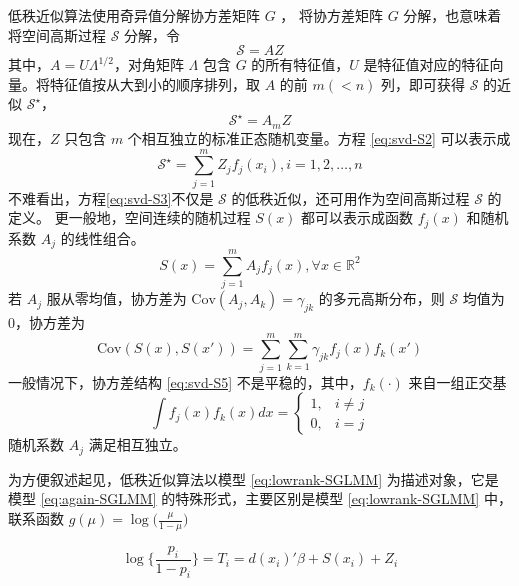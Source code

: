 \documentclass[12pt,a4paper,UTF8,twoside]{book}
\theoremstyle{definition}
\theoremstyle{definition}
\theoremstyle{definition}
\theoremstyle{remark}
\begin{document}
低秩近似算法使用奇异值分解协方差矩阵 \(G\) \citep{Diggle2007}，
将协方差矩阵 \(G\) 分解，也意味着将空间高斯过程 \(\mathcal{S}\) 分解，令
\[\mathcal{S} = AZ\] \noindent 其中，\(A = U\Lambda^{1/2}\)，对角矩阵
\(\Lambda\) 包含 \(G\) 的所有特征值，\(U\)
是特征值对应的特征向量。将特征值按从大到小的顺序排列，取 \(A\) 的前
\(m(<n)\) 列，即可获得 \(\mathcal{S}\) 的近似 \(\mathcal{S}^{\star}\)，
\begin{equation}
\mathcal{S}^{\star} = A_{m}Z \label{eq:svd-S2}
\end{equation} \noindent 现在，\(Z\) 只包含 \(m\)
个相互独立的标准正态随机变量。方程 \eqref{eq:svd-S2} 可以表示成
\begin{equation}
\mathcal{S}^{\star} = \sum_{j=1}^{m}Z_{j}f_{j}(x_{i}), i = 1,2,\ldots,n \label{eq:svd-S3}
\end{equation} \noindent 不难看出，方程\eqref{eq:svd-S3}不仅是
\(\mathcal{S}\) 的低秩近似，还可用作为空间高斯过程 \(\mathcal{S}\)
的定义。 更一般地，空间连续的随机过程 \(S(x)\) 都可以表示成函数
\(f_{j}(x)\) 和随机系数 \(A_{j}\) 的线性组合。 \begin{equation}
S(x) = \sum_{j=1}^{m}A_{j}f_{j}(x), \forall x \in \mathbb{R}^2 \label{eq:svd-S4}
\end{equation} \noindent 若 \(A_j\) 服从零均值，协方差为
\(\mathrm{Cov}(A_{j},A_{k})=\gamma_{jk}\) 的多元高斯分布，则
\(\mathcal{S}\) 均值为0，协方差为 \begin{equation}
\mathrm{Cov}(S(x),S(x')) =  \sum_{j=1}^{m}\sum_{k=1}^{m}\gamma_{jk}f_{j}(x)f_{k}(x') \label{eq:svd-S5}
\end{equation} \noindent 一般情况下，协方差结构 \eqref{eq:svd-S5}
不是平稳的，其中，\(f_{k}(\cdot)\) 来自一组正交基 \begin{equation*}
\int f_{j}(x)f_{k}(x)dx = 
\begin{cases}
1, & i \neq j \\
0, & i = j
\end{cases}
\end{equation*} \noindent  随机系数 \(A_{j}\) 满足相互独立。

为方便叙述起见，低秩近似算法以模型 \eqref{eq:lowrank-SGLMM}
为描述对象，它是模型 \eqref{eq:again-SGLMM} 的特殊形式，主要区别是模型
\eqref{eq:lowrank-SGLMM} 中，联系函数
\(g(\mu) = \log\big(\frac{\mu}{1-\mu}\big)\)

\begin{equation}
\log\{\frac{p_i}{1-p_i}\}  = T_{i} = d(x_i)'\beta + S(x_i) + Z_{i} \label{eq:lowrank-SGLMM}
\end{equation}
\end{document}
